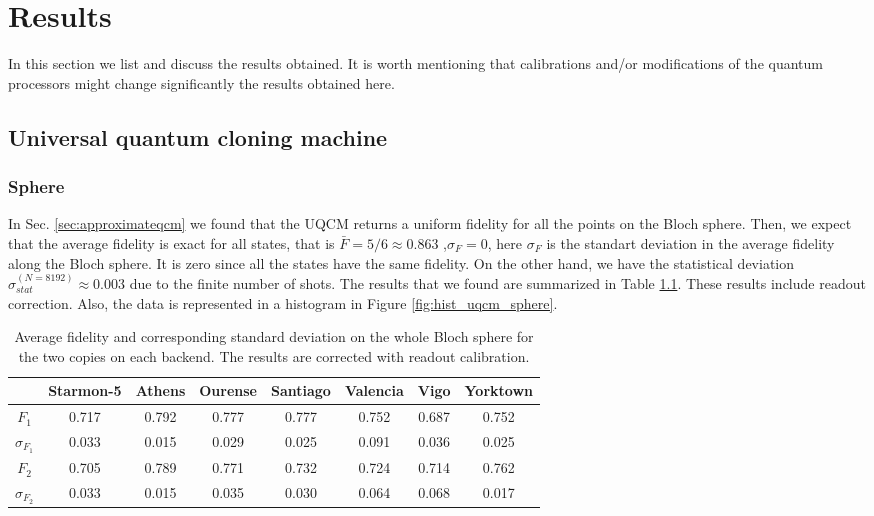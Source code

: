 \chapter{Results}
\label{sec:results}

In this section we list and discuss the results obtained.
It is worth mentioning that calibrations and/or modifications of the quantum processors might change significantly the results obtained here.

\section{Universal quantum cloning machine}
    
\subsection{Sphere}

In Sec. \ref{sec:approximateqcm} we found that the UQCM returns a uniform fidelity for all the points on the Bloch sphere. Then, we expect that the average fidelity is exact for all states, that is $\bar{F} = 5/6 \approx 0.863$ ,$\sigma_{F} = 0$, here $\sigma_F$ is the standart deviation in the average fidelity along the Bloch sphere. It is zero since all the states have the same fidelity. On the other hand, we have the statistical deviation $\sigma_{stat}^{(N=8192)}\approx 0.003$ due to the finite number of shots. The results that we found are summarized in Table \ref{tab:uqcm_results_full_sphere}. These results include readout correction. Also, the data is represented in a histogram in Figure \ref{fig:hist_uqcm_sphere}. 

\begin{table}[H]
    \centering
    \begin{tabular}{|c|c|c|c|c|c|c|c|}
    \hline
    \textbf{} & \textbf{Starmon-5} & \textbf{Athens} & \textbf{Ourense} & \textbf{Santiago} & \textbf{Valencia} & \textbf{Vigo} & \textbf{Yorktown} \\ \hline
    $F_1$              & 0.717 & 0.792 & 0.777 & 0.777 & 0.752 & 0.687 & 0.752\\ \hline
    $\sigma_{F_1}$     & 0.033 & 0.015 & 0.029 & 0.025 & 0.091 & 0.036 & 0.025 \\ \hline
    $F_2$              & 0.705 & 0.789 & 0.771 & 0.732 & 0.724 & 0.714 & 0.762 \\ \hline
    $\sigma_{F_2}$     & 0.033 & 0.015 & 0.035 & 0.030 & 0.064 & 0.068 & 0.017 \\ \hline
    \end{tabular}
    \caption{Average fidelity and corresponding standard deviation on the whole Bloch sphere for the two copies on each backend. The results are corrected with readout calibration.}\label{tab:uqcm_results_full_sphere}
\end{table}

